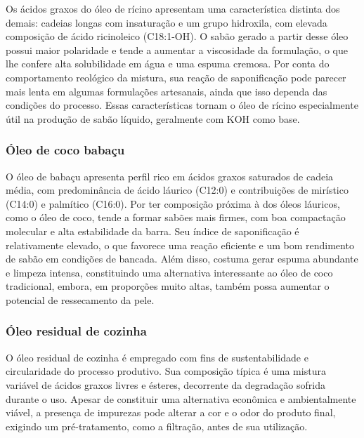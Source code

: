 Os ácidos graxos do óleo de rícino apresentam uma característica distinta dos demais: cadeias longas com insaturação e um grupo hidroxila, com elevada composição de ácido ricinoleico (C18:1-OH). O sabão gerado a partir desse óleo possui maior polaridade e tende a aumentar a viscosidade da formulação, o que lhe confere alta solubilidade em água e uma espuma cremosa. Por conta do comportamento reológico da mistura, sua reação de saponificação pode parecer mais lenta em algumas formulações artesanais, ainda que isso dependa das condições do processo. Essas características tornam o óleo de rícino especialmente útil na produção de sabão líquido, geralmente com KOH como base.

\subsubsection{Óleo de coco babaçu}
\label{subsubsec:oleo_babacu}

O óleo de babaçu apresenta perfil rico em ácidos graxos saturados de cadeia média, com predominância de ácido láurico (C12:0) e contribuições de mirístico (C14:0) e palmítico (C16:0). Por ter composição próxima à dos óleos láuricos, como o óleo de coco, tende a formar sabões mais firmes, com boa compactação molecular e alta estabilidade da barra. Seu índice de saponificação é relativamente elevado, o que favorece uma reação eficiente e um bom rendimento de sabão em condições de bancada. Além disso, costuma gerar espuma abundante e limpeza intensa, constituindo uma alternativa interessante ao óleo de coco tradicional, embora, em proporções muito altas, também possa aumentar o potencial de ressecamento da pele.

\subsubsection{Óleo residual de cozinha}

O óleo residual de cozinha é empregado com fins de sustentabilidade e circularidade do processo produtivo. Sua composição típica é uma mistura variável de ácidos graxos livres e ésteres, decorrente da degradação sofrida durante o uso. Apesar de constituir uma alternativa econômica e ambientalmente viável, a presença de impurezas pode alterar a cor e o odor do produto final, exigindo um pré-tratamento, como a filtração, antes de sua utilização.